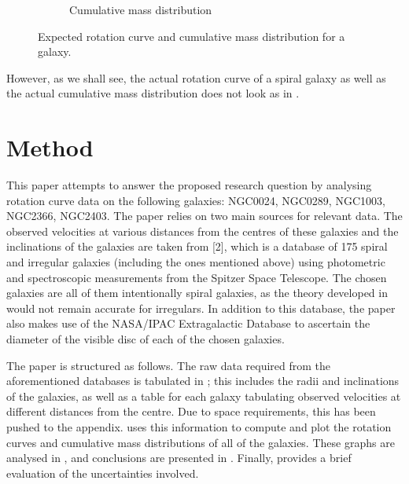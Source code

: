\documentclass{article}
\begin{document}
\begin{figure}
\begin{subfigure}{0.4\textwidth}
        \caption{Cumulative mass distribution}
    \end{subfigure}
    \caption{Expected rotation curve and cumulative mass distribution for a galaxy.}
    \label{fig:expectedgraphs}
\end{figure}

However, as we shall see, the actual rotation curve of a spiral galaxy as well as the actual cumulative mass distribution does not look as in .


\section{Method}\label{sec:method}

This paper attempts to answer the proposed research question by analysing rotation curve data on the following galaxies: NGC0024, NGC0289, NGC1003, NGC2366, NGC2403.
The paper relies on two main sources for relevant data.
The observed velocities at various distances from the centres of these galaxies and the inclinations of the galaxies are taken from [2], which is a database of 175 spiral and irregular galaxies (including the ones mentioned above) using photometric and spectroscopic measurements from the Spitzer Space Telescope.
The chosen galaxies are all of them intentionally spiral galaxies, as the theory developed in  would not remain accurate for irregulars.
In addition to this database, the paper also makes use of the NASA/IPAC Extragalactic Database to ascertain the diameter of the visible disc of each of the chosen galaxies.

The paper is structured as follows.
The raw data required from the aforementioned databases is tabulated in ; this includes the radii and inclinations of the galaxies, as well as a table for each galaxy tabulating observed velocities at different distances from the centre.
Due to space requirements, this has been pushed to the appendix.
 uses this information to compute and plot the rotation curves and cumulative mass distributions of all of the galaxies.
These graphs are analysed in , and conclusions are presented in .
Finally,  provides a brief evaluation of the uncertainties involved.
\end{document}
